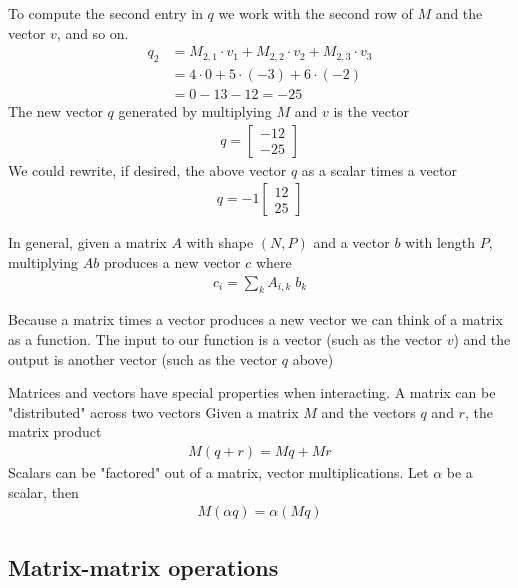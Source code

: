 To compute the second entry in $q$ we work with the second row of $M$ and the vector $v$, and so on.
\begin{align}
    q_{2} &= M_{2,1} \cdot v_{1} + M_{2,2} \cdot v_{2} + M_{2,3} \cdot v_{3} \\  
          &= 4 \cdot 0 + 5 \cdot (-3) + 6 \cdot (-2)\\
          &= 0 -13 -12 = -25
\end{align}
The new vector $q$ generated by multiplying $M$ and $v$ is the vector 
\begin{align}
    q = \begin{bmatrix}
        -12\\
        -25
    \end{bmatrix}
\end{align}
We could rewrite, if desired, the above vector $q$ as a scalar times a vector 
\begin{align}
    q = -1\begin{bmatrix}
        12\\
        25
    \end{bmatrix}
\end{align}

In general, given a matrix $A$ with shape $(N,P)$ and a vector $b$ with length $P$, multiplying $A b$ produces a new vector $c$ where 
\begin{align}
    c_{i} = \sum_{k} A_{i,k}\; b_{k} 
\end{align}

Because a matrix times a vector produces a new vector we can think of a matrix as a function. 
The input to our function is a vector (such as the vector $v$) and the output is another vector (such as the vector $q$ above)

Matrices and vectors have special properties when interacting. A matrix can be "distributed" across two vectors
Given a matrix $M$ and the vectors $q$ and $r$, the matrix product
\begin{align}
    M (q + r)  = M q + M r
\end{align}
Scalars can be "factored" out of a matrix, vector multiplications. 
Let $\alpha$ be a scalar, then 
\begin{align}
    M (\alpha q ) = \alpha \left(M q\right) 
\end{align}

\subsection{Matrix-matrix operations}
\hspace{1mm} \vspace{-0.75cm}
